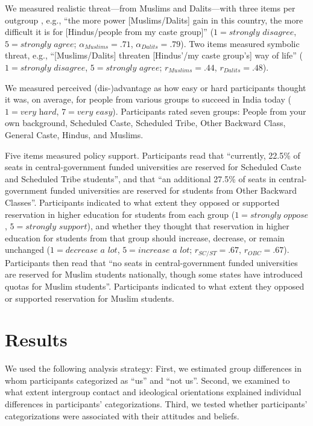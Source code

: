 \documentclass[12pt, a4paper]{article}
\begin{document}
We measured realistic threat---from Muslims and Dalits---with three items per outgroup \cite{schmid_reducing_2014}, e.g., ``the more power [Muslims/Dalits] gain in this country, the more difficult it is for [Hindus/people from my caste group]'' ($1 = \textit{strongly disagree}$, $5 = \textit{strongly agree}$; $\alpha_\textit{Muslims} = .71$, $\alpha_\textit{Dalits} = .79$). Two items measured symbolic threat, e.g., ``[Muslims/Dalits] threaten [Hindus'/my caste group's] way of life'' ($1 = \textit{strongly disagree}$, $5 = \textit{strongly agree}$; $r_\textit{Muslims} = .44$, $r_\textit{Dalits} = .48$).

We measured perceived (dis-)advantage as how easy or hard participants thought it was, on average, for people from various groups to succeed in India today ($1 = \textit{very hard}$, $7 = \textit{very easy}$). Participants rated seven groups: People from your own background, Scheduled Caste, Scheduled Tribe, Other Backward Class, General Caste, Hindus, and Muslims.

Five items measured policy support. Participants read that ``currently, 22.5\% of seats in central-government funded universities are reserved for Scheduled Caste and Scheduled Tribe students'', and that ``an additional 27.5\% of seats in central-government funded universities are reserved for students from Other Backward Classes''. Participants indicated to what extent they opposed or supported reservation in higher education for students from each group ($1 = \textit{strongly oppose}$, $5 = \textit{strongly support}$), and whether they thought that reservation in higher education for students from that group should increase, decrease, or remain unchanged ($1 = \textit{decrease a lot}$, $5 = \textit{increase a lot}$; $r_\textit{SC/ST} = .67$, $r_\textit{OBC} = .67$). Participants then read that ``no seats in central-government funded universities are reserved for Muslim students nationally, though some states have introduced quotas for Muslim students''. Participants indicated to what extent they opposed or supported reservation for Muslim students.

\section{Results}

We used the following analysis strategy: First, we estimated group differences in whom participants categorized as ``us'' and ``not us''. Second, we examined to what extent intergroup contact and ideological orientations explained individual differences in participants' categorizations. Third, we tested whether participants' categorizations were associated with their attitudes and beliefs.
\end{document}
